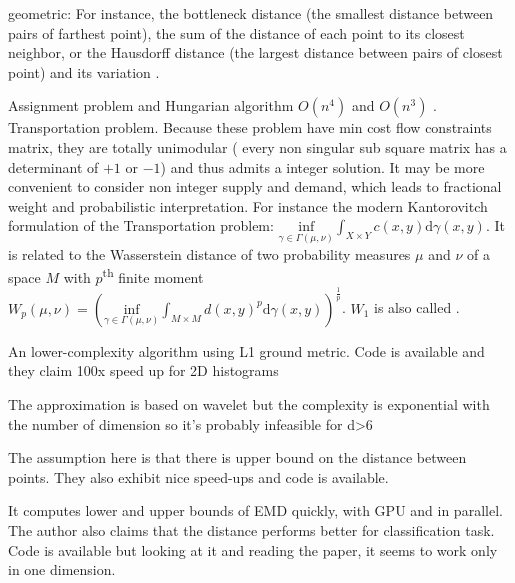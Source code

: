 geometric: For instance, the bottleneck distance \autocite{Bottleneck96} (the
smallest distance between pairs of farthest point), the sum of the distance of
each point to its closest neighbor, or the Hausdorff distance (the largest
distance between pairs of closest point) and its variation
\autocite{ModifiedHausdorff94}.

Assignment problem and Hungarian algorithm $O(n^4)$ and $O(n^3)$
\autocite{Hungarian57}. Transportation problem. Because these problem have min
cost flow constraints matrix, they are totally unimodular (\ie{} every non
singular sub square matrix has a determinant of $+1$ or $-1$) and thus admits
a integer solution. It may be more convenient to consider non integer supply
and demand, which leads to fractional weight and probabilistic interpretation.
For instance the modern Kantorovitch formulation of the Transportation
problem: $\underset{\gamma \in \Gamma(\mu, \nu)}{\mathrm{inf}} \int_{X\times
Y} c(x,y)\mathrm{d}\gamma(x,y)$. It is related to the Wasserstein distance of
two probability measures $\mu$ and $\nu$ of a space $M$ with
$p$\textsuperscript{th} finite moment $W_p(\mu, \nu) = \left( \underset{\gamma
\in \Gamma(\mu, \nu)}{\mathrm{inf}} \int_{M\times M}
d(x,y)^p\mathrm{d}\gamma(x,y)\right)^{\frac{1}{p}}$. $W_1$ is also called
 \autocite{EMD98}.


An lower-complexity algorithm using L1 ground metric. Code is available and
they claim 100x speed up for 2D histograms \autocite{Ling2007}

The approximation is based on wavelet but the complexity is exponential with
the number of dimension so it's probably infeasible for d>6
\autocite{Shirdhonkar2008}

The assumption here is that there is upper bound on the distance between
points. They also exhibit nice speed-ups and code is available.
\autocite{Pele2009}

It computes lower and upper bounds of EMD quickly, with GPU and in parallel.
The author also claims that the distance performs better for classification
task. Code is available but looking at it and reading the paper, it seems to
work only in one dimension. \autocite{FastEMD13}


